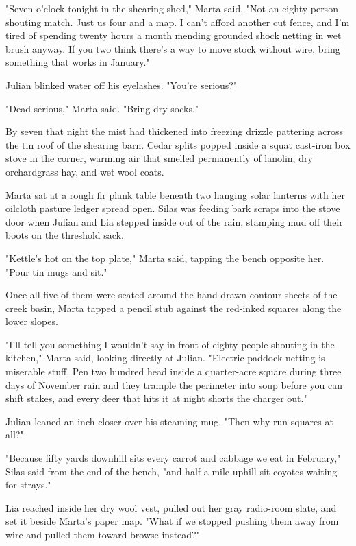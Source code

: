"Seven o'clock tonight in the shearing shed," Marta said. "Not an eighty-person shouting match. Just us four and a map. I can't afford another cut fence, and I'm tired of spending twenty hours a month mending grounded shock netting in wet brush anyway. If you two think there's a way to move stock without wire, bring something that works in January."

Julian blinked water off his eyelashes. "You're serious?"

"Dead serious," Marta said. "Bring dry socks."

\bigskip

By seven that night the mist had thickened into freezing drizzle pattering across the tin roof of the shearing barn. Cedar splits popped inside a squat cast-iron box stove in the corner, warming air that smelled permanently of lanolin, dry orchardgrass hay, and wet wool coats.

Marta sat at a rough fir plank table beneath two hanging solar lanterns with her oilcloth pasture ledger spread open. Silas was feeding bark scraps into the stove door when Julian and Lia stepped inside out of the rain, stamping mud off their boots on the threshold sack.

"Kettle's hot on the top plate," Marta said, tapping the bench opposite her. "Pour tin mugs and sit."

Once all five of them were seated around the hand-drawn contour sheets of the creek basin, Marta tapped a pencil stub against the red-inked squares along the lower slopes.

"I'll tell you something I wouldn't say in front of eighty people shouting in the kitchen," Marta said, looking directly at Julian. "Electric paddock netting is miserable stuff. Pen two hundred head inside a quarter-acre square during three days of November rain and they trample the perimeter into soup before you can shift stakes, and every deer that hits it at night shorts the charger out."

Julian leaned an inch closer over his steaming mug. "Then why run squares at all?"

"Because fifty yards downhill sits every carrot and cabbage we eat in February," Silas said from the end of the bench, "and half a mile uphill sit coyotes waiting for strays."

Lia reached inside her dry wool vest, pulled out her gray radio-room slate, and set it beside Marta's paper map. "What if we stopped pushing them away from wire and pulled them toward browse instead?"

